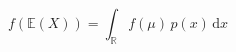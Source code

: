 \documentclass[preview]{standalone}
\begin{document}
\begin{equation}
\tag{22}
    f ( \mathbb{E} ( X ) ) = \int_{\mathbb{R}} f ( \mu ) \, p ( x ) \, \mathrm{d}x
\end{equation}
\end{document}
